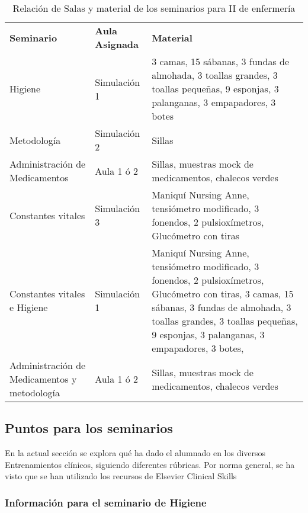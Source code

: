 \begin{table}[H]
\centering
\begin{tabular}{N{0.2\textwidth}N{0.12\textwidth}M{0.6\textwidth}}
{\color[HTML]{FFFFFF} \textbf{Seminario}} &
  {\color[HTML]{FFFFFF} \textbf{Aula Asignada}} &
  {\color[HTML]{FFFFFF} \textbf{Material}} \\
Higiene &
  Simulación 1 &
  3 camas, 15 sábanas, 3 fundas de almohada, 3 toallas grandes, 3 toallas pequeñas, 9 esponjas, 3 palanganas, 3 empapadores, 3 botes \\
Metodología &
  Simulación 2 &
  Sillas \\
Administración de Medicamentos &
  Aula 1 ó 2 &
  Sillas, muestras mock de medicamentos, chalecos verdes \\
Constantes vitales &
  Simulación 3 &
  Maniquí Nursing Anne, tensiómetro modificado, 3 fonendos, 2 pulsioxímetros, Glucómetro con tiras \\ \hline
Constantes vitales e Higiene &
  Simulación 1 &
  Maniquí Nursing Anne, tensiómetro modificado, 3 fonendos, 2 pulsioxímetros, Glucómetro con tiras, 3 camas, 15 sábanas, 3 fundas de almohada, 3 toallas grandes, 3 toallas pequeñas, 9 esponjas, 3 palanganas, 3 empapadores, 3 botes, \\
Administración de Medicamentos y metodología &
  Aula 1 ó 2 &
  Sillas, muestras mock de medicamentos, chalecos verdes\\
  \hline
\end{tabular}
\caption{Relación de Salas y material de los seminarios para II de enfermería}
\label{tab:PlanXVIII:SalasEstaciones}
\end{table}
\subsection{Puntos para los seminarios}
En la actual sección se explora qué ha dado el alumnado en los diversos Entrenamientos clínicos, siguiendo diferentes rúbricas. Por norma general, se ha visto que se han utilizado los recursos de Elsevier Clinical Skills
\subsubsection{Información para el seminario de Higiene}



